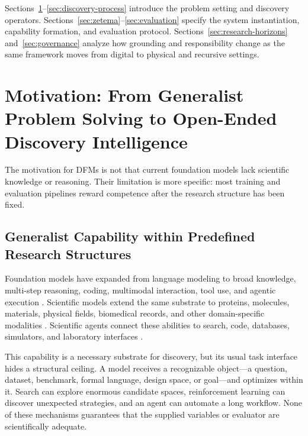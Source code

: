 \documentclass[11pt, a4paper, copyright]{google}
\begin{document}
Sections~\ref{sec:motivation}--\ref{sec:discovery-process} introduce the problem setting and discovery operators. Sections~\ref{sec:zetema}--\ref{sec:evaluation} specify the system instantiation, capability formation, and evaluation protocol. Sections~\ref{sec:research-horizons} and~\ref{sec:governance} analyze how grounding and responsibility change as the same framework moves from digital to physical and recursive settings.

\section{Motivation: From Generalist Problem Solving to Open-Ended Discovery Intelligence}
\label{sec:motivation}

The motivation for DFMs is not that current foundation models lack scientific knowledge or reasoning. Their limitation is more specific: most training and evaluation pipelines reward competence after the research structure has been fixed. 

\subsection{Generalist Capability within Predefined Research Structures}
\label{subsec:generalist-intelligence}

Foundation models have expanded from language modeling to broad knowledge, multi-step reasoning, coding, multimodal interaction, tool use, and agentic execution \citep{brown2020fewshot,wei2022cot,yao2023react,schick2023toolformer,guo2025deepseek}. Scientific models extend the same substrate to proteins, molecules, materials, physical fields, biomedical records, and other domain-specific modalities \citep{jumper2021alphafold,abramson2024alphafold3,merchant2023gnome,zeni2025mattergen,lam2023graphcast,price2025gencast}. Scientific agents connect these abilities to search, code, databases, simulators, and laboratory interfaces \citep{bran2024chemcrow,boiko2023coscientist,swanson2025virtuallab,gottweis2026coscientist,ghareeb2026robin}.

This capability is a necessary substrate for discovery, but its usual task interface hides a structural ceiling. A model receives a recognizable object---a question, dataset, benchmark, formal language, design space, or goal---and optimizes within it. Search can explore enormous candidate spaces, reinforcement learning can discover unexpected strategies, and an agent can automate a long workflow. None of these mechanisms guarantees that the supplied variables or evaluator are scientifically adequate.
\end{document}
